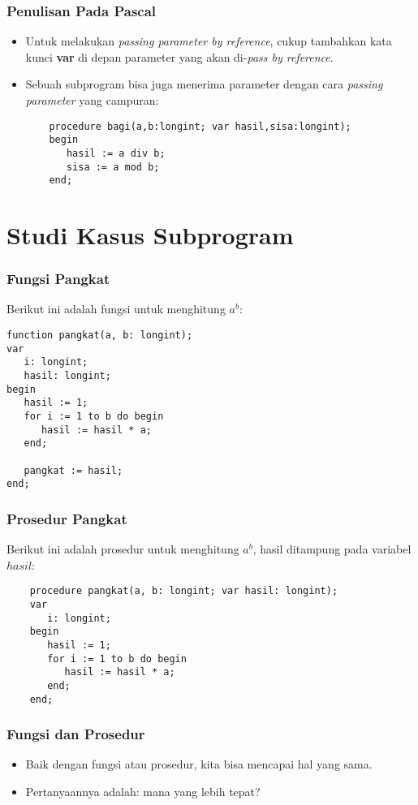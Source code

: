 \documentclass{beamer}
\begin{document}
\begin{frame}[fragile]
\frametitle{Penulisan Pada Pascal}
\begin{itemize}
	\item Untuk melakukan \textit{passing parameter by reference}, cukup tambahkan kata kunci \textbf{var} di depan parameter yang akan di-\textit{pass by reference}.
	\item Sebuah subprogram bisa juga menerima parameter dengan cara \textit{passing parameter} yang campuran:
	\begin{lstlisting}
	procedure bagi(a,b:longint; var hasil,sisa:longint);
	begin
	   hasil := a div b;
	   sisa := a mod b;
	end;	
	\end{lstlisting}
\end{itemize}
\end{frame}

\section{Studi Kasus Subprogram}
\frame{\sectionpage}

\begin{frame}[fragile]
\frametitle{Fungsi Pangkat}
Berikut ini adalah fungsi untuk menghitung $a^b$:
\begin{lstlisting}
function pangkat(a, b: longint);
var
   i: longint;
   hasil: longint;
begin
   hasil := 1;
   for i := 1 to b do begin
      hasil := hasil * a;
   end;
   
   pangkat := hasil;
end;	
\end{lstlisting}
\end{frame}

\begin{frame}[fragile]
\frametitle{Prosedur Pangkat}
Berikut ini adalah prosedur untuk menghitung $a^b$, hasil ditampung pada variabel $hasil$:
\begin{lstlisting}
	procedure pangkat(a, b: longint; var hasil: longint);
	var
	   i: longint;
	begin
	   hasil := 1;
	   for i := 1 to b do begin
	      hasil := hasil * a;
	   end;
	end;		
\end{lstlisting}
\end{frame}

\begin{frame}[fragile]
\frametitle{Fungsi dan Prosedur}
\begin{itemize}
	\item Baik dengan fungsi atau prosedur, kita bisa mencapai hal yang sama.
	\item Pertanyaannya adalah: \alert{mana yang lebih tepat}?
\end{itemize}
\end{frame}
\end{document}
